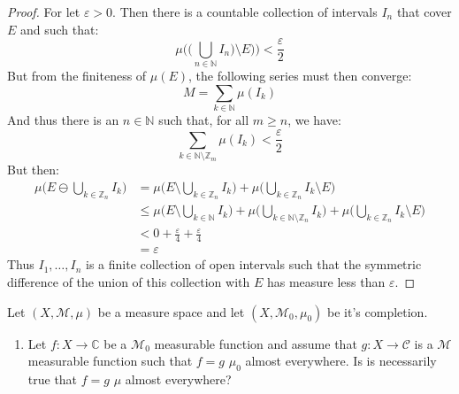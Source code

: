 \documentclass[crop=false,class=article]{standalone}                           %
\begin{document}
        \begin{proof}
            For let $\varepsilon>0$. Then there is a countable collection of
            intervals $I_{n}$ that cover $E$ and such that:
            \begin{equation}
                \mu\Big(\big(\bigcup_{n\in\mathbb{N}}I_{n}\big)
                    \setminus{E}\big)\Big)
                <\frac{\varepsilon}{2}
            \end{equation}
            But from the finiteness of $\mu(E)$, the following series must then
            converge:
            \begin{equation}
                M=\sum_{k\in\mathbb{N}}\mu(I_{k})
            \end{equation}
            And thus there is an $n\in\mathbb{N}$ such that, for all $m\geq{n}$,
            we have:
            \begin{equation}
                \sum_{k\in\mathbb{N}\setminus\mathbb{Z}_{m}}\mu(I_{k})
                <\frac{\varepsilon}{2}
            \end{equation}
            But then:
            \begin{align}
                \mu\Big(E\ominus\bigcup_{k\in\mathbb{Z}_{n}}I_{k}\Big)
                &=\mu\Big(E\setminus\bigcup_{k\in\mathbb{Z}_{n}}I_{k}\Big)+
                    \mu\Big(\bigcup_{k\in\mathbb{Z}_{n}}I_{k}
                    \setminus{E}\Big)\\
                &\leq\mu\Big(E\setminus\bigcup_{k\in\mathbb{N}}I_{k}\Big)
                    +\mu\Big(\bigcup_{k\in\mathbb{N}
                    \setminus\mathbb{Z}_{n}}I_{k}\Big)
                    +\mu\Big(\bigcup_{k\in\mathbb{Z}_{n}}I_{k}
                    \setminus{E}\Big)\\
                &<0+\frac{\varepsilon}{4}+\frac{\varepsilon}{4}\\
                &=\varepsilon
            \end{align}
            Thus $I_{1},\dots,I_{n}$ is a finite collection of open intervals
            such that the symmetric difference of the union of this collection
            with $E$ has measure less than $\varepsilon$.
        \end{proof}
        \begin{problem}
            Let $(X,\mathcal{M},\mu)$ be a measure space and let
            $(X,\mathcal{M}_{0},\mu_{0})$ be it's completion.
            \begin{enumerate}
                \item   Let $f:X\rightarrow\mathbb{C}$ be a $\mathcal{M}_{0}$
                        measurable function and assume that
                        $g:X\rightarrow\mathcal{C}$ is a $\mathcal{M}$
                        measurable function such that $f=g$ $\mu_{0}$ almost
                        everywhere. Is is necessarily true that $f=g$ $\mu$
                        almost everywhere?
            \end{enumerate}
        \end{problem}
\end{document}
